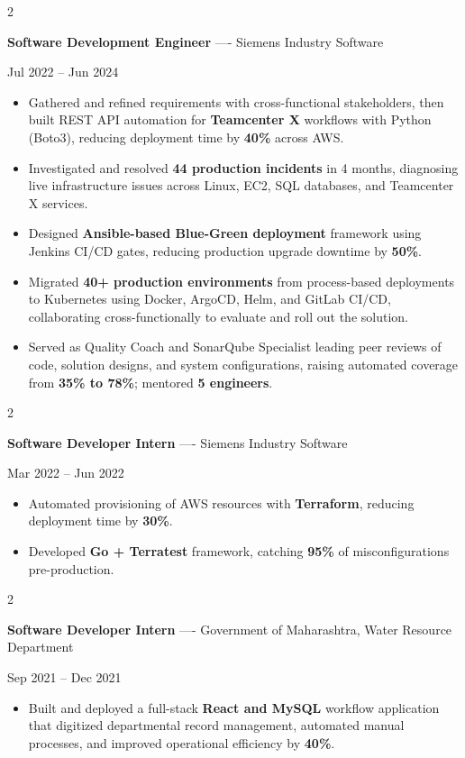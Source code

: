 \documentclass[10pt, letterpaper]{article}
\newenvironment{highlights}{
    \begin{itemize}[
        topsep=0.10 cm,
        parsep=0.06 cm,
        partopsep=0pt,
        itemsep=0.06 cm,
        leftmargin=12pt
    ]
}{
    \end{itemize}
}
\newenvironment{twocolentry}[2][]{
    \onecolentry
    \def\secondColumn{#2}
    \setcolumnwidth{\fill, 4.5 cm}
    \begin{paracol}{2}
}{
    \switchcolumn \raggedleft \secondColumn
    \end{paracol}
    \endonecolentry
}
\begin{document}
\vspace{0.15 cm}

\begin{twocolentry}{Jul 2022 -- Jun 2024}
\textbf{Software Development Engineer} ---- Siemens Industry Software
\end{twocolentry}
\begin{highlights}
  \item Gathered and refined requirements with cross-functional stakeholders, then built REST API automation for \textbf{Teamcenter X} workflows with Python (Boto3), reducing deployment time by \textbf{40\%} across AWS.
  \item Investigated and resolved \textbf{44 production incidents} in 4 months, diagnosing live infrastructure issues across Linux, EC2, SQL databases, and Teamcenter X services.
  \item Designed \textbf{Ansible-based Blue-Green deployment} framework using Jenkins CI/CD gates, reducing production upgrade downtime by \textbf{50\%}.
  \item Migrated \textbf{40+ production environments} from process-based deployments to Kubernetes using Docker, ArgoCD, Helm, and GitLab CI/CD, collaborating cross-functionally to evaluate and roll out the solution.
  \item Served as Quality Coach and SonarQube Specialist leading peer reviews of code, solution designs, and system configurations, raising automated coverage from \textbf{35\% to 78\%}; mentored \textbf{5 engineers}.
\end{highlights}

\vspace{0.15 cm}

\begin{twocolentry}{Mar 2022 -- Jun 2022}
\textbf{Software Developer Intern} ---- Siemens Industry Software
\end{twocolentry}
\begin{highlights}
  \item Automated provisioning of AWS resources with \textbf{Terraform}, reducing deployment time by \textbf{30\%}.
  \item Developed \textbf{Go + Terratest} framework, catching \textbf{95\%} of misconfigurations pre-production.
\end{highlights}

\vspace{0.15 cm}

\begin{twocolentry}{Sep 2021 -- Dec 2021}
\textbf{Software Developer Intern} ---- Government of Maharashtra, Water Resource Department
\end{twocolentry}
\begin{highlights}
  \item Built and deployed a full-stack \textbf{React and MySQL} workflow application that digitized departmental record management, automated manual processes, and improved operational efficiency by \textbf{40\%}.
\end{highlights}
\end{document}
